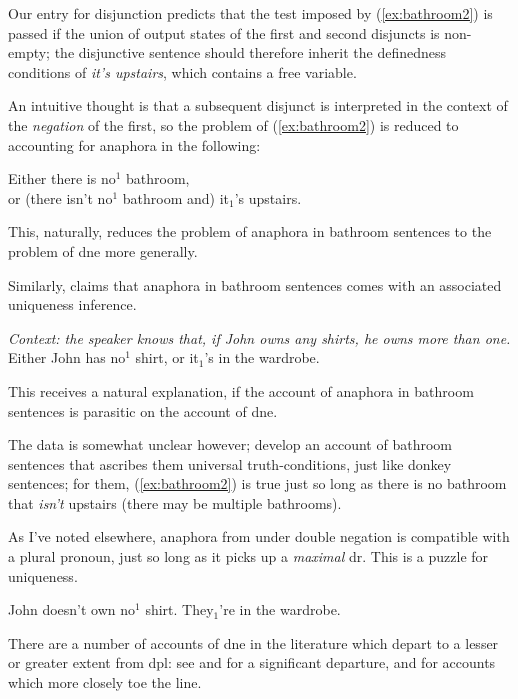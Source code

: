\documentclass[nols,twoside,nofonts,nobib,nohyper]{tufte-handout}
\theoremstyle{definition}
\begin{document}
Our entry for disjunction predicts that the test imposed by (\ref{ex:bathroom2}) is passed if the union of output states of the first and second disjuncts is non-empty; the disjunctive sentence should therefore inherit the definedness conditions of \textit{it's upstairs}, which contains a free variable.

An intuitive thought is that a subsequent disjunct is interpreted in the context of the \textit{negation} of the first, so the problem of (\ref{ex:bathroom2}) is reduced to accounting for anaphora in the following:

\ex
Either there is no$^{1}$ bathroom,\\
or (there isn't no$^{1}$ bathroom and) it$_{1}$'s upstairs.
\xe

This, naturally, reduces the problem of anaphora in bathroom sentences to the problem of \ac{dne} more generally.

Similarly, \citet{Gotham2019} claims that anaphora in bathroom sentences comes with an associated uniqueness inference.

\ex \textit{Context: the speaker knows that, if John owns any shirts, he owns more than one.}\\
Either John has no$^{1}$ shirt, or it$_{1}$'s in the wardrobe.
\xe

This receives a natural explanation, if the account of anaphora in bathroom sentences is parasitic on the account of \ac{dne}.

The data is somewhat unclear however; \citet{KrahmerMuskens1995} develop an account of bathroom sentences that ascribes them universal truth-conditions, just like donkey sentences; for them, (\ref{ex:bathroom2}) is true just so long as there is no bathroom that \textit{isn't} upstairs (there may be multiple bathrooms).

As I've noted elsewhere, anaphora from under double negation is compatible with a plural pronoun, just so long as it picks up a \textit{maximal} \ac{dr}. This is a puzzle for uniqueness.

\ex
John doesn't own no$^{1}$ shirt. They$_{1}$'re in the wardrobe.
\xe

There are a number of accounts of \ac{dne} in the literature which depart to a lesser or greater extent from \ac{dpl}: see \cite{Rothschild2017} and \cite{Mandelkern2020a,Mandelkern2020b} for a significant departure, and \cite{KrahmerMuskens1995,Gotham2019,Elliott2020b} for accounts which more closely toe the line.
\end{document}
